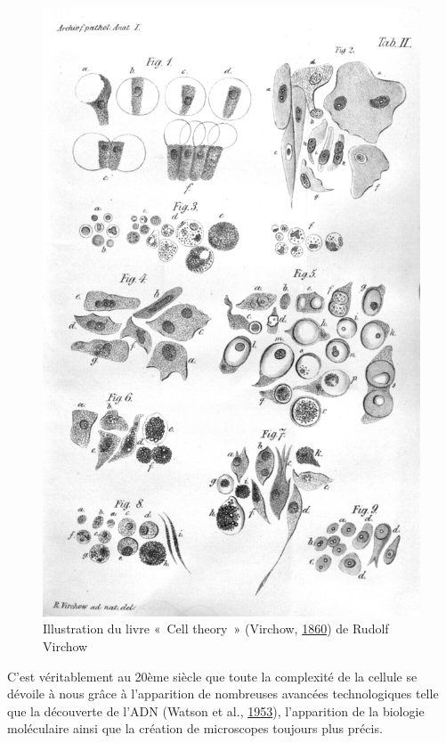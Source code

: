 \documentclass[12pt,a4paper,twoside,openright]{book}
\begin{document}
\begin{figure}[htbp]
\centering
\includegraphics{figures/intro/virchow.png}
\caption{\label{fig:virchow}Illustration du livre «~Cell theory~»
(Virchow, \protect\hyperlink{ref-virchow1860cellular}{1860}) de Rudolf
Virchow}
\end{figure}

C'est véritablement au 20ème siècle que toute la complexité de la
cellule se dévoile à nous grâce à l'apparition de nombreuses avancées
technologiques telle que la découverte de l'ADN (Watson et al.,
\protect\hyperlink{ref-watson1953molecular}{1953}), l'apparition de la
biologie moléculaire ainsi que la création de microscopes toujours plus
précis.
\end{document}
